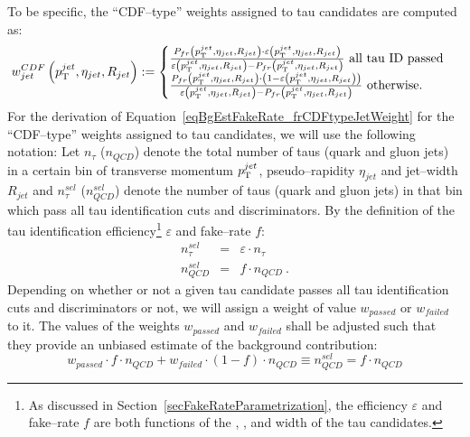 To be specific, the ``CDF--type'' weights assigned to tau candidates are
computed as:
\begin{equation}
w_{jet}^{CDF} \left( p_{\mathrm{T}}^{jet}, \eta_{jet}, R_{jet} \right) 
:= 
\begin{cases} 
   \frac{P_{fr} \left( p_{\mathrm{T}}^{jet}, \eta_{jet}, R_{jet} \right) \cdot 
         \varepsilon \left( p_{\mathrm{T}}^{jet}, \eta_{jet}, R_{jet} \right)}
        {\varepsilon \left( p_{\mathrm{T}}^{jet}, \eta_{jet}, R_{jet} \right) - P_{fr} \left( p_{\mathrm{T}}^{jet}, \eta_{jet}, R_{jet} \right)}~\mbox{all tau ID passed} \\
   \frac{P_{fr} \left( p_{\mathrm{T}}^{jet}, \eta_{jet}, R_{jet} \right) \cdot 
         \left( 1 - \varepsilon \left( p_{\mathrm{T}}^{jet}, \eta_{jet}, R_{jet} \right) \right)}
        {\varepsilon \left( p_{\mathrm{T}}^{jet}, \eta_{jet}, R_{jet} \right) - P_{fr}
        \left( p_{\mathrm{T}}^{jet}, \eta_{jet}, R_{jet} \right)}~\mbox{otherwise.}
\end{cases}
\label{eqBgEstFakeRate_frCDFtypeJetWeight}
\end{equation}
For the derivation of Equation~\ref{eqBgEstFakeRate_frCDFtypeJetWeight} for the
``CDF--type'' weights assigned to tau candidates, we will use the following
notation: Let $n_{\tau}$ ($n_{QCD}$) denote the total number of taus (quark and
gluon jets) in a certain bin of transverse momentum $p_{\mathrm{T}}^{jet}$,
pseudo--rapidity $\eta_{jet}$ and jet--width $R_{jet}$ and $n_{\tau}^{sel}$
($n_{QCD}^{sel}$) denote the number of taus (quark and gluon jets) in that bin
which pass all tau identification cuts and discriminators.  By the definition of
the tau identification efficiency\footnote{As discussed in
Section~\ref{secFakeRateParametrization}, the efficiency $\varepsilon$ and
fake--rate $f$ are both functions of the \pt, \eta, and width of the tau
candidates.} $\varepsilon$ and fake--rate $f$:
\begin{eqnarray}
n_{\tau}^{sel} & = & \varepsilon \cdot n_{\tau} \nonumber \\
n_{QCD}^{sel} & = & f \cdot n_{QCD}~.
\label{eqBgEstFakeRate_eff_and_frDef}
\end{eqnarray}
Depending on whether or not a given tau candidate passes all tau
identification cuts and discriminators or not, we will assign a weight of value
$w_{passed}$ or $w_{failed}$ to it.
The values of the weights $w_{passed}$ and $w_{failed}$ shall be adjusted such
that they provide an unbiased estimate of the background contribution:
\begin{equation}
w_{passed} \cdot f \cdot n_{QCD} + w_{failed} \cdot \left( 1 - f \right) \cdot n_{QCD} \equiv n_{QCD}^{sel} = f \cdot n_{QCD}
\label{eqBgEstFakeRate_QCD}
\end{equation}
